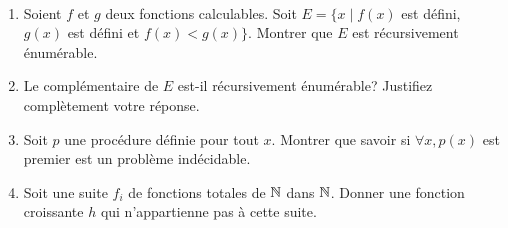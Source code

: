 \documentclass[french,a4paper,10pt]{article}
\begin{document}
    \begin{td-exo}[3]\,
        \begin{enumerate}
            \item Soient $f$ et $g$ deux fonctions calculables. 
            Soit $E=\{x\mid f(x)$ est défini, $g(x)$ est défini et $f(x)<g(x)\}$. 
            Montrer que $E$ est récursivement énumérable.

            \item Le complémentaire de $E$ est-il récursivement énumérable? Justifiez complètement votre réponse.

            \item Soit $p$ une procédure définie pour tout $x$. 
            Montrer que savoir si $\forall x,p(x)$ est premier est un problème indécidable.

            \item Soit une suite $f_i$ de fonctions totales de $\mathbb{N}$ dans $\mathbb{N}$. 
            Donner une fonction croissante $h$ qui n'appartienne pas à cette suite.
        \end{enumerate}
    \end{td-exo}
\end{document}
